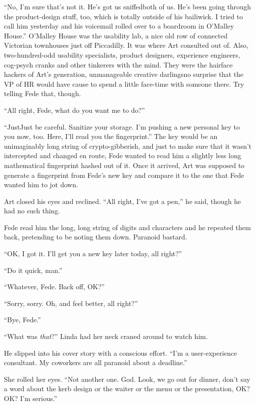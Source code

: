 “No, I’m sure that’s not it. He’s got us sniffed{\dash}both of us. He’s
been going through the product-design stuff, too, which is totally
outside of his bailiwick. I tried to call him yesterday and his
voicemail rolled over to a boardroom in O’Malley House.” O’Malley
House was the usability lab, a nice old row of connected Victorian
townhouses just off Piccadilly. It was where Art consulted out of.
Also, two-hundred-odd usability specialists, product designers,
experience engineers, cog-psych cranks and other tinkerers with the
mind. They were the hairface hackers of Art’s generation,
unmanageable creative darlings{\dash}no surprise that the VP of HR would
have cause to spend a little face-time with someone there. Try
telling Fede that, though.

“All right, Fede, what do you want me to do?”

“Just{\dash}Just be careful. Sanitize your storage. I’m pushing a new
personal key to you now, too. Here, I’ll read you the fingerprint.”
The key would be an unimaginably long string of crypto-gibberish,
and just to make sure that it wasn’t intercepted and changed en
route, Fede wanted to read him a slightly less long mathematical
fingerprint hashed out of it. Once it arrived, Art was supposed to
generate a fingerprint from Fede’s new key and compare it to the
one that Fede wanted him to jot down.

Art closed his eyes and reclined. “All right, I’ve got a pen,” he
said, though he had no such thing.

Fede read him the long, long string of digits and characters and he
repeated them back, pretending to be noting them down. Paranoid
bastard.

“OK, I got it. I’ll get you a new key later today, all right?”

“Do it quick, man.”

“Whatever, Fede. Back off, OK?”

“Sorry, sorry. Oh, and feel better, all right?”

“Bye, Fede.”

“What was \emph{that}?” Linda had her neck craned around to watch
him.

He slipped into his cover story with a conscious effort. “I’m a
user-experience consultant. My coworkers are all paranoid about a
deadline.”

She rolled her eyes. “Not another one. God. Look, we go out for
dinner, don’t say a word about the kerb design or the waiter or the
menu or the presentation, OK? OK? I’m serious.”

